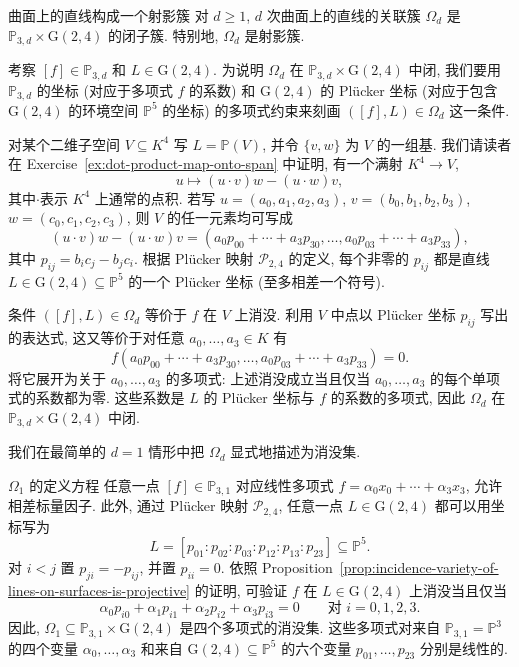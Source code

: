 \begin{Proposition}{曲面上的直线构成一个射影簇}\leavevmode\label{prop:incidence-variety-of-lines-on-surfaces-is-projective}
对 $d\ge1$, $d$ 次曲面上的直线的关联簇 $\Omega_{d}$ 是 $\mathbb{P}_{3,d}\times\mathrm{G}(2,4)$ 的闭子簇. 特别地, $\Omega_{d}$ 是射影簇.
\end{Proposition}
\begin{Proof}
考察 $[f]\in\mathbb{P}_{3,d}$ 和 $L\in\mathrm{G}(2,4)$. 为说明 $\Omega_{d}$ 在 $\mathbb{P}_{3,d}\times\mathrm{G}(2,4)$ 中闭, 我们要用 $\mathbb{P}_{3,d}$ 的坐标 (对应于多项式 $f$ 的系数) 和 $\mathrm{G}(2,4)$ 的 Plücker 坐标 (对应于包含 $\mathrm{G}(2,4)$ 的环境空间 $\mathbb{P}^{5}$ 的坐标) 的多项式约束来刻画 $([f],L)\in\Omega_{d}$ 这一条件.

对某个二维子空间 $V\subseteq K^{4}$ 写 $L=\mathbb{P}(V)$, 并令 $\{v,w\}$ 为 $V$ 的一组基. 我们请读者在 Exercise~\ref{ex:dot-product-map-onto-span} 中证明, 有一个满射 $K^{4}\to V$,
\[
  u\mapsto(u\cdot v)w-(u\cdot w)v,
\]
其中\textquotedbl{}$\cdot$\textquotedbl{}表示 $K^{4}$ 上通常的点积. 若写 $u=(a_{0},a_{1},a_{2},a_{3})$, $v=(b_{0},b_{1},b_{2},b_{3})$, $w=(c_{0},c_{1},c_{2},c_{3})$, 则 $V$ 的任一元素均可写成
\[
  (u\cdot v)w-(u\cdot w)v=(a_{0}p_{00}+\cdots+a_{3}p_{30},\ldots,
  a_{0}p_{03}+\cdots+a_{3}p_{33}),
\]
其中 $p_{ij}=b_{i}c_{j}-b_{j}c_{i}$. 根据 Plücker 映射 $\mathcal{P}_{2,4}$ 的定义, 每个非零的 $p_{ij}$ 都是直线 $L\in\mathrm{G}(2,4)\subseteq\mathbb{P}^{5}$ 的一个 Plücker 坐标 (至多相差一个符号).

条件 $([f],L)\in\Omega_{d}$ 等价于 $f$ 在 $V$ 上消没. 利用 $V$ 中点以 Plücker 坐标 $p_{ij}$ 写出的表达式, 这又等价于对任意 $a_{0},\ldots,a_{3}\in K$ 有
\[
  f(a_{0}p_{00}+\cdots+a_{3}p_{30},\ldots,a_{0}p_{03}+\cdots+a_{3}p_{33})=0.
\]
将它展开为关于 $a_{0},\ldots,a_{3}$ 的多项式: 上述消没成立当且仅当 $a_{0},\ldots,a_{3}$ 的每个单项式的系数都为零. 这些系数是 $L$ 的 Plücker 坐标与 $f$ 的系数的多项式, 因此 $\Omega_{d}$ 在 $\mathbb{P}_{3,d}\times\mathrm{G}(2,4)$ 中闭.
\end{Proof}

我们在最简单的 $d=1$ 情形中把 $\Omega_{d}$ 显式地描述为消没集.

\begin{Example}{$\Omega_{1}$ 的定义方程}\leavevmode\label{ex:equations-defining-incidence-variety-in-degree-one}
任意一点 $[f]\in\mathbb{P}_{3,1}$ 对应线性多项式 $f=\alpha_{0}x_{0}+\cdots+\alpha_{3}x_{3}$, 允许相差标量因子. 此外, 通过 Plücker 映射 $\mathcal{P}_{2,4}$, 任意一点 $L\in\mathrm{G}(2,4)$ 都可以用坐标写为
\[
  L=[p_{01}:p_{02}:p_{03}:p_{12}:p_{13}:p_{23}]\subseteq\mathbb{P}^{5}.
\]
对 $i<j$ 置 $p_{ji}=-p_{ij}$, 并置 $p_{ii}=0$. 依照 Proposition~\ref{prop:incidence-variety-of-lines-on-surfaces-is-projective} 的证明, 可验证 $f$ 在 $L\in\mathrm{G}(2,4)$ 上消没当且仅当
\[
  \alpha_{0}p_{i0}+\alpha_{1}p_{i1}+\alpha_{2}p_{i2}+\alpha_{3}p_{i3}=0
  \qquad\text{对 }i=0,1,2,3.
\]
因此, $\Omega_{1}\subseteq\mathbb{P}_{3,1}\times\mathrm{G}(2,4)$ 是四个多项式的消没集. 这些多项式对来自 $\mathbb{P}_{3,1}=\mathbb{P}^{3}$ 的四个变量 $\alpha_{0},\ldots,\alpha_{3}$ 和来自 $\mathrm{G}(2,4)\subseteq\mathbb{P}^{5}$ 的六个变量 $p_{01},\ldots,p_{23}$ 分别是线性的.
\end{Example}

